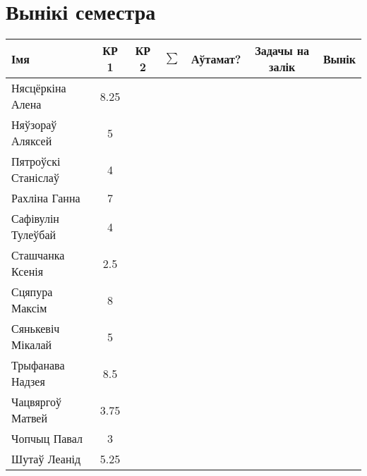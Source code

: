 


    \section{Вынікі семестра}
    \begin{table}[H]
        \begin{tabular}{|l|c|c|c|c|c|c|}
            \hline
            Імя                 &    КР 1    &    КР 2   & $\sum$ &  Аўтамат?  &  Задачы на залік  &    Вынік  \\ \hline
            Нясцёркіна Алена    &   8.25   &  &  & &  & \\ \hline
            Няўзораў Аляксей    &  5   &  &  & &  & \\ \hline
            Пятроўскі Станіслаў &   4   &  &  & &  & \\ \hline
            Рахліна Ганна       &   7   &  &  & &  & \\ \hline
            Сафівулін Тулеўбай  &   4   &  &  & &  & \\ \hline
            Сташчанка Ксенія    & 2.5 &  &  & &  & \\ \hline
            Сцяпура Максім      &    8     &  &  & &  & \\ \hline
            Сянькевіч Мікалай   &  5 &  &  & &  & \\ \hline
            Трыфанава Надзея    &   8.5   &  &  & &  & \\ \hline
            Чацвяргоў Матвей    &      3.75   &  &  & &  & \\ \hline
            Чопчыц Павал        &    3    &  &  & &  & \\ \hline
            Шутаў Леанід        &   5.25   &  &  & &  & \\ \hline
        \end{tabular}
    \end{table}


